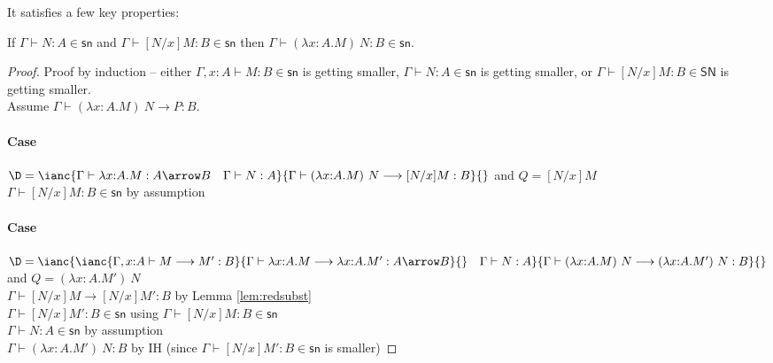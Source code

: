 \documentclass{article}
\newcommand{\SN}{\mathsf{SN}}
\newcommand{\csn}{\mathsf{sn}}
\newcommand{\red}{\longrightarrow}
\newcommand{\redsn}{\longrightarrow_\csn}
\begin{document}
\noindent It satisfies a few  key properties:


\begin{lemma}\label{lm:bclosed}
If $\Gamma \vdash N : A \in \csn$ and $\Gamma \vdash [N/x]M : B \in \csn$
then $\Gamma \vdash (\lambda x{:}A.M)~N : B \in \csn$.
\end{lemma}
\begin{proof}
Proof by induction -- either $\Gamma, x{:}A \vdash M : B \in \csn$ is getting smaller,
$\Gamma \vdash N : A \in \csn$ is getting smaller, or
$\Gamma \vdash [N/x]M : B \in \SN$  is getting smaller.\\[1em]
Assume $\Gamma \vdash (\lambda x{:}A.M)~N \red P : B$.

\paragraph{Case}
  $\D = \ianc {\Gamma \vdash \lambda x{:}A.M : A \arrow B
         \quad \Gamma \vdash  N : A}
              {\Gamma \vdash (\lambda x{:}A.M)~N  \red [N/x]M : B }{}$ and $ Q = [N/x]M$
 \\
$\Gamma \vdash [N/x]M : B \in \csn$ \hfill by assumption

\paragraph{Case}
 $\D = \ianc {\ianc{\Gamma, x{:}A \vdash M \red M' : B}
                   {\Gamma \vdash \lambda x{:}A.M \red \lambda x{:}A.M' : A \arrow B }{}
        \quad \Gamma \vdash N : A}
             {\Gamma \vdash (\lambda x{:}A.M)~N \red (\lambda x{:}A.M')~N : B}{}$
 and $Q = (\lambda x{:}A.M')~N$
\\[0.5em]
$\Gamma \vdash [N/x]M \red [N/x]M' : B$ \hfill by Lemma \ref{lem:redsubst} \\
$\Gamma \vdash [N/x]M' : B \in \csn$ \hfill using $\Gamma \vdash [N/x]M : B \in \csn$ \\
$\Gamma \vdash N : A \in \csn$ \hfill by assumption \\
$\Gamma \vdash (\lambda x{:}A.M')~N : B$ \hfill by IH (since $\Gamma \vdash [N/x]M' : B \in \csn$ is smaller)


\end{proof}
\end{document}

